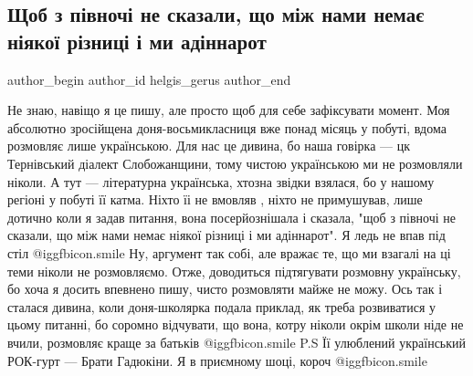  
 
 
 
 
 
\subsection{Щоб з півночі не сказали, що між нами немає ніякої різниці і ми адіннарот}
\label{sec:30_08_2021.fb.helgis_gerus.1.semja_ukrainizacia_mova}
 
\ifcmt
 author_begin
   author_id helgis_gerus
 author_end
\fi

\obeycr
Не знаю, навіщо я це пишу, але просто щоб для себе зафіксувати момент.
Моя абсолютно зросійщена доня-восьмикласниця вже понад місяць у побуті, вдома розмовляє лише українською.
Для нас це дивина, бо наша говірка — цк Тернівський діалект Слобожанщини, тому чистою українською ми не розмовляли ніколи.
А тут — літературна українська, хтозна звідки взялася, бо у нашому регіоні у побуті її катма.
Ніхто їі не вмовляв , ніхто не примушував, лише дотично коли я задав питання, вона посерйознішала і сказала, "щоб з півночі не сказали, що між нами немає ніякої різниці і ми адіннарот".
Я ледь не впав під стіл  @igg{fbicon.smile}  
Ну, аргумент так собі, але вражає те, що ми взагалі на ці теми ніколи не розмовляємо.
Отже, доводиться підтягувати розмовну українську, бо хоча я досить впевнено пишу, чисто розмовляти майже не можу.
Ось так і сталася дивина, коли доня-школярка подала приклад, як треба розвиватися у цьому питанні, бо соромно відчувати, що вона, котру ніколи окрім школи ніде не вчили, розмовляє краще за батьків  @igg{fbicon.smile} 
P.S Її улюблений український РОК-гурт — Брати Гадюкіни.
Я в приємному шоці, короч  @igg{fbicon.smile} 
\restorecr

